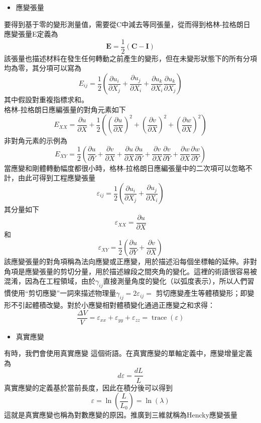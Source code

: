 \begin{itemize}
\item 應變張量
\end{itemize}

要得到基于零的變形測量值，需要從C中減去等同張量，從而得到格林-拉格朗日應變張量E定義為\
$$\mathbf{E}=\frac{1}{2}(\mathbf{C}-\mathbf{I})$$
該張量也描述材料在發生任何轉動之前產生的變形，但在未變形狀態下的所有分項均為零，其分項可以寫為\
$$E_{i j}=\frac{1}{2}\left(\frac{\partial u_i}{\partial X_j}+\frac{\partial u_j}{\partial X_i}+\frac{\partial u_k}{\partial X_i} \frac{\partial u_k}{\partial X_j}\right)$$
其中假設對重複指標求和。\\
格林-拉格朗日應編張量的對角元素如下\
$$E_{X X}=\frac{\partial u}{\partial X}+\frac{1}{2}\left(\left(\frac{\partial u}{\partial X}\right)^2+\left(\frac{\partial v}{\partial X}\right)^2+\left(\frac{\partial w}{\partial X}\right)^2\right)$$
非對角元素的示例為\
$$E_{X Y}=\frac{1}{2}\left(\frac{\partial u}{\partial Y}+\frac{\partial v}{\partial X}+\frac{\partial u}{\partial X} \frac{\partial u}{\partial Y}+\frac{\partial v}{\partial X} \frac{\partial v}{\partial Y}+\frac{\partial w}{\partial X} \frac{\partial w}{\partial Y}\right)$$
當應變和剛體轉動幅度都很小時，格林-拉格朗日應編張量中的二次項可以忽略不計，由此可得到工程應變張量\
$$\varepsilon_{i j}=\frac{1}{2}\left(\frac{\partial u_i}{\partial X_j}+\frac{\partial u_j}{\partial X_i}\right)$$
其分量如下\
$$\varepsilon_{X X}=\frac{\partial u}{\partial X}$$
和\
$$\varepsilon_{X Y}=\frac{1}{2}\left(\frac{\partial u}{\partial Y}+\frac{\partial v}{\partial X}\right)$$
該應變張量的對角項稱為法向應變或正應變，用於描述沿每個坐標軸的延伸。非對角項是應變張量的剪切分量，用於描述線段之間夾角的變化。這裡的術語很容易被混淆，因為在工程領域，由於$\gamma_{i j}$直接測量角度的變化（以弧度表示），所以人們習慣使用“剪切應變”一詞來描述物理量$\gamma_{i j}=2 \varepsilon_{i j}=$
剪切應變產生等體積變形；即變形不引起體積改變。對於小應變相對體積變化通過正應變之和求得：\
$$\frac{\Delta V}{V}=\varepsilon_{x x}+\varepsilon_{y y}+\varepsilon_{z z}=\operatorname{trace}(\varepsilon)$$

\begin{itemize}
\item 真實應變
\end{itemize}

有時，我們會使用真實應變 這個術語。在真實應變的單軸定義中，應變增量定義為\
$$d \varepsilon=\frac{d L}{L}$$
真實應變的定義基於當前長度，因此在積分後可以得到\
$$\varepsilon=\ln \left(\frac{L}{L_0}\right)=\ln (\lambda)$$
這就是真實應變也稱為對數應變的原因。推廣到三維就稱為Hencky應變張量\

